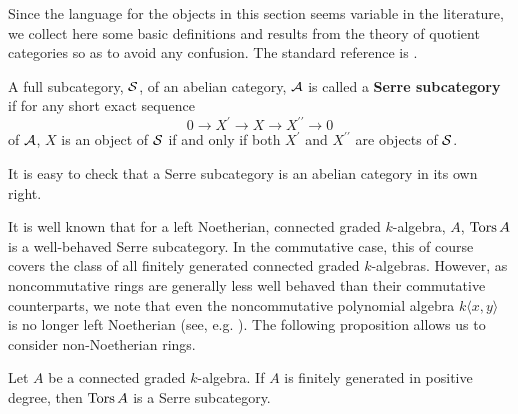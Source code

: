 Since the language for the objects in this section seems variable in the literature, we collect here some basic definitions and results from the theory of quotient categories so as to avoid any confusion.
The standard reference is \textcite{DCA62}.

\begin{definition}
  A full subcategory, \(\mathcal{S}\), of an abelian category, \(\mathcal{A}\) is called a \textbf{Serre subcategory} if for any short exact sequence
  \[0 \to X^\prime \to X \to X^{\prime\prime} \to 0\]
  of \(\mathcal{A}\), \(X\) is an object of \(\mathcal{S}\) if and only if both \(X^\prime\) and \(X^{\prime\prime}\) are objects of \(\mathcal{S}\).
\end{definition}

\begin{remark}
  It is easy to check that a Serre subcategory is an abelian category in its own right.
\end{remark}

It is well known that for a left Noetherian, connected graded \(k\)-algebra, \(A\), \(\operatorname{Tors}A\) is a well-behaved Serre subcategory.
In the commutative case, this of course covers the class of all finitely generated connected graded \(k\)-algebras.
However, as noncommutative rings are generally less well behaved than their commutative counterparts, we note that even the noncommutative polynomial algebra \(k\langle x,y\rangle\) is no longer left Noetherian (see, e.g. \textcite[Exercise 1, p. 8]{Goodearl}).
The following proposition allows us to consider non-Noetherian rings.

\begin{proposition}\label{proposition: f.g. torsion}
  Let \(A\) be a connected graded \(k\)-algebra.
  If \(A\) is finitely generated in positive degree, then \(\operatorname{Tors}A\) is a Serre subcategory.
\end{proposition}

